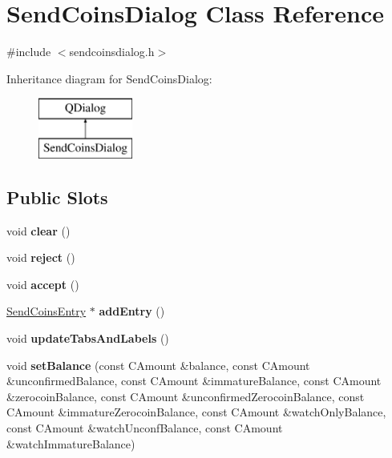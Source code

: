 \hypertarget{class_send_coins_dialog}{}\section{Send\+Coins\+Dialog Class Reference}
\label{class_send_coins_dialog}


{\ttfamily \#include $<$sendcoinsdialog.\+h$>$}

Inheritance diagram for Send\+Coins\+Dialog\+:\begin{figure}[H]
\begin{center}
\leavevmode
\includegraphics[height=2.000000cm]{class_send_coins_dialog}
\end{center}
\end{figure}
\subsection*{Public Slots}
\begin{DoxyCompactItemize}
\item 
\mbox{\label{class_send_coins_dialog_a127bddff45f49ff5e6e263efe218ae26}} 
void {\bfseries clear} ()
\item 
\mbox{\label{class_send_coins_dialog_a4879553d77d29f522ac92ac04580f4ad}} 
void {\bfseries reject} ()
\item 
\mbox{\label{class_send_coins_dialog_af2185c3d29e43d37c30669f0def46060}} 
void {\bfseries accept} ()
\item 
\mbox{\label{class_send_coins_dialog_a3d680a76b967641115c6ff2fa83fb62a}} 
\mbox{\hyperlink{class_send_coins_entry}{Send\+Coins\+Entry}} $\ast$ {\bfseries add\+Entry} ()
\item 
\mbox{\label{class_send_coins_dialog_a3b834c739f7d02d8086a2bf58525c5f0}} 
void {\bfseries update\+Tabs\+And\+Labels} ()
\item 
\mbox{\label{class_send_coins_dialog_a5f778ec12cec433369144077d660a53d}} 
void {\bfseries set\+Balance} (const C\+Amount \&balance, const C\+Amount \&unconfirmed\+Balance, const C\+Amount \&immature\+Balance, const C\+Amount \&zerocoin\+Balance, const C\+Amount \&unconfirmed\+Zerocoin\+Balance, const C\+Amount \&immature\+Zerocoin\+Balance, const C\+Amount \&watch\+Only\+Balance, const C\+Amount \&watch\+Unconf\+Balance, const C\+Amount \&watch\+Immature\+Balance)
\end{DoxyCompactItemize}
